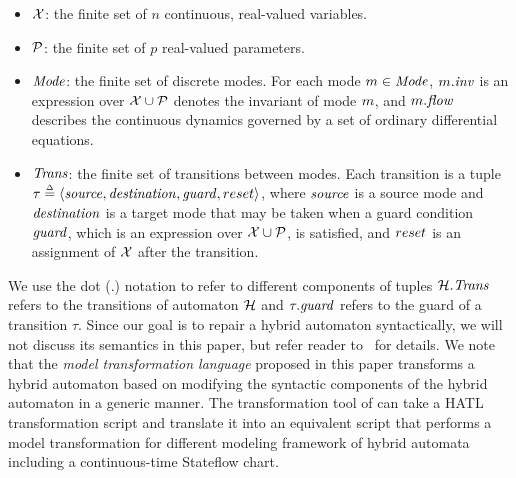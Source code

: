 %
\begin{itemize}[leftmargin= 2em]
%
\item $\X$: the finite set of $n$ continuous, real-valued variables.
\item $\P$: the finite set of $p$ real-valued parameters.
\item $\Locset$: the finite set of discrete modes. For each mode $\mode \in \Locset$, $\mode.\inveg$ is an expression over $\X \cup \P$ denotes the invariant of mode $\mode$, and $\mode.\floweg$ describes the continuous dynamics governed by a set of ordinary differential equations. %
\item $\Transset$: the finite set of transitions between modes. Each transition is a tuple $\tau \deq \tuple{\src, \dst, \guard, \reset}$, where $\src$ is a source mode and $\dst$ is a target mode that may be taken when a guard condition $\guard$, which is an expression over $\X \cup \P$, is satisfied, and $\reset$ is an assignment of $\X$ after the transition.
%
%
\end{itemize}
%
We use the dot (.) notation to refer to different components of tuples \eg $\AutomatonH.\Transset$ refers to the transitions of automaton $\AutomatonH$ and $\tau.\guard$ refers to the guard of a transition $\tau$. Since our goal is to repair a hybrid automaton syntactically, we will not discuss its semantics in this paper, but refer reader to~\cite{alur1995algorithmic} for details.
%
We note that the \emph{model transformation language} proposed in this paper transforms a hybrid automaton based on modifying the syntactic components of the hybrid automaton in a generic manner.
%
The transformation tool of \toolreaffirm can take a HATL transformation script and translate it into an equivalent script that performs a model transformation for different modeling framework of hybrid automata including a continuous-time Stateflow chart.
%

